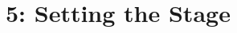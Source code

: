 \documentclass[10pt]{report}
\begin{document}
%
%
%
% 
%
%
%
%
%

%
%
%

\chapter*{5: Setting the Stage}

%
%
\end{document}
